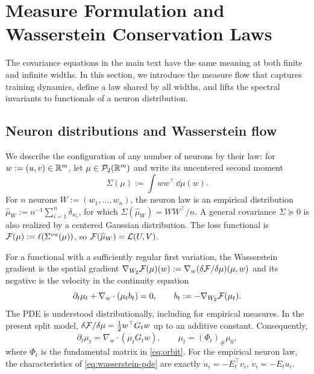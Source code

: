 
\section{Measure Formulation and Wasserstein Conservation Laws}
\label{app:mean-field}
The covariance equations in the main text have the same meaning at both finite and infinite widths. In this section, we introduce the measure flow that captures training dynamics, define a law shared by all widths, and lifts the spectral invariants to functionals of a neuron distribution.

\subsection{Neuron distributions and Wasserstein flow}
We describe the configuration of any number of neurons by their law: for $w:=(u,v)\in\mathbb{R}^m$, let
$\mu\in\mathcal P_2(\mathbb{R}^m)$ and write its uncentered second moment
\begin{equation}\label{eq:measure-covariance}
 \Sigma(\mu):=\int ww^\top\,\dd\mu(w).
\end{equation}
For $n$ neurons $W:=(w_1,\ldots,w_n)$, the neuron law is an empirical distribution 
$\widehat\mu_W:=n^{-1}\sum_{i=1}^n\delta_{w_i}$, for which 
$\Sigma(\widehat\mu_W)=WW^\top/n$. A general covariance
$\Sigma\succeq0$ is also realized by a centered Gaussian distribution.
The loss functional is $\mathcal F(\mu):=\ell(\Sigma^{vu}(\mu))$, so
$\mathcal F(\widehat\mu_W)=\mathcal L(U,V)$.

For a functional with a sufficiently regular first variation, the
Wasserstein gradient is the spatial gradient
$\nabla_{W_2}\mathcal F(\mu)(w):=\nabla_w(\delta\mathcal F/\delta\mu)(\mu,w)$ and its negative is the velocity in the continuity equation
\begin{equation}\label{eq:wasserstein-pde}
 \partial_t\mu_t+\nabla_w\cdot(\mu_t b_t)=0,\qquad
 b_t:=-\nabla_{W_2}\mathcal F(\mu_t).
\end{equation}
The PDE is understood distributionally, including for empirical
measures. In the present split model,
$\delta\mathcal F/\delta\mu=\tfrac12 w^\top G_tw$ up to an additive constant.
Consequently, 
\begin{equation}\label{eq:split-wasserstein-pde}
 \partial_t\mu_t=\nabla_w\cdot(\mu_tG_tw),\qquad
 \mu_t=(\Phi_t)_\#\mu_0,
\end{equation}
where $\Phi_t$ is the fundamental matrix in \eqref{eq:orbit}.
For the empirical neuron law, the characteristics of \eqref{eq:wasserstein-pde} are exactly
$\dot u_i=-E_t^\top v_i$, $\dot v_i=-E_tu_i$.

